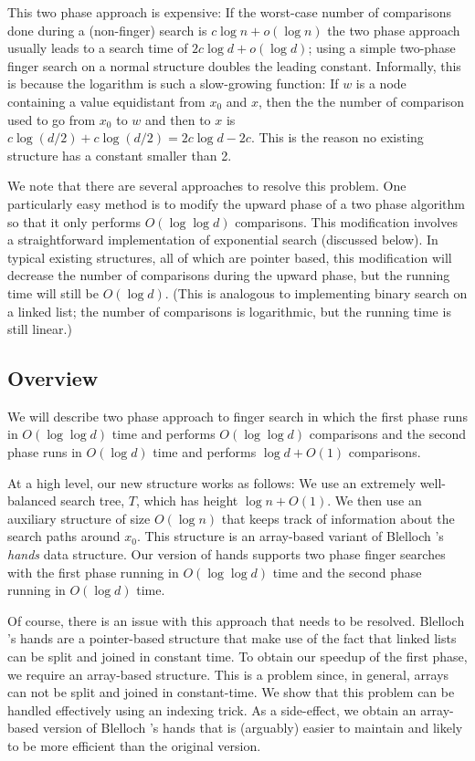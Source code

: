 \documentclass{patmorin}
\begin{document}
This two phase approach is expensive: If the worst-case number of
comparisons done during a (non-finger) search is $c\log n+o(\log n)$ the
two phase approach usually leads to a search time of $2c\log d+o(\log d)$;
using a simple two-phase finger search on a normal structure doubles the
leading constant.  Informally, this is because the logarithm is such a
slow-growing function: If $w$ is a node containing a value equidistant
from $x_0$ and $x$, then the the number of comparison used to go from
$x_0$ to $w$ and then to $x$ is $c\log(d/2) + c\log(d/2) = 2c\log d - 2c$.
This is the reason no existing structure has a constant smaller than 2.

We note that there are several approaches to resolve this problem.
One particularly easy method is to modify the upward phase of a two
phase algorithm so that it only performs $O(\log \log d)$ comparisons.
This modification involves a straightforward implementation of exponential
search (discussed below).  In typical existing structures, all of
which are pointer based, this modification will decrease the number of
comparisons during the upward phase, but the running time will still
be $O(\log d)$.  (This is analogous to implementing binary search on a
linked list; the number of comparisons is logarithmic, but the running
time is still linear.)

\subsection{Overview}

We will describe two phase approach to finger search in which the
first phase runs in $O(\log\log d)$ time and performs $O(\log\log d)$
comparisons and the second phase runs in $O(\log d)$ time and performs
$\log d+ O(1)$ comparisons.

At a high level, our new structure works as follows: We use an extremely
well-balanced search tree, $T$, which has height $\log n+ O(1)$.
We then use an auxiliary structure of size $O(\log n)$ that keeps track
of information about the search paths around $x_0$.  This structure is
an array-based variant of Blelloch \etal's \emph{hands} data structure.
Our version of hands supports two phase finger searches with the first phase
running in $O(\log\log d)$ time and the second phase running in $O(\log
d)$ time.

Of course, there is an issue with this approach that needs to be resolved.
Blelloch \etal's hands are a pointer-based structure that make use of
the fact that linked lists can be split and joined in constant time.
To obtain our speedup of the first phase, we require an array-based
structure.  This is a problem since, in general, arrays can not be split
and joined in constant-time.  We show that this problem can be handled
effectively using an indexing trick.  As a side-effect, we obtain
an array-based version of Blelloch \etal's hands that is (arguably) easier
to maintain and likely to be more efficient than the original version.
\end{document}
